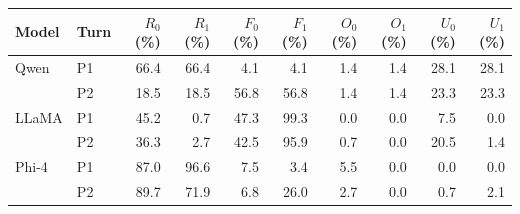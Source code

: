 \begingroup
\setlength{\tabcolsep}{2.2pt}
\begin{tabular}{@{}llrrrrrrrr@{}}
\toprule
Model & Turn & $R_0$ (\%) & $R_1$ (\%) & $F_0$ (\%) & $F_1$ (\%) & $O_0$ (\%) & $O_1$ (\%) & $U_0$ (\%) & $U_1$ (\%) \\
\midrule
Qwen & P1 & 66.4 & 66.4 & 4.1 & 4.1 & 1.4 & 1.4 & 28.1 & 28.1 \\
 & P2 & 18.5 & 18.5 & 56.8 & 56.8 & 1.4 & 1.4 & 23.3 & 23.3 \\
\addlinespace
LLaMA & P1 & 45.2 & 0.7 & 47.3 & 99.3 & 0.0 & 0.0 & 7.5 & 0.0 \\
 & P2 & 36.3 & 2.7 & 42.5 & 95.9 & 0.7 & 0.0 & 20.5 & 1.4 \\
\addlinespace
Phi-4 & P1 & 87.0 & 96.6 & 7.5 & 3.4 & 5.5 & 0.0 & 0.0 & 0.0 \\
 & P2 & 89.7 & 71.9 & 6.8 & 26.0 & 2.7 & 0.0 & 0.7 & 2.1 \\
\bottomrule
\end{tabular}
\endgroup